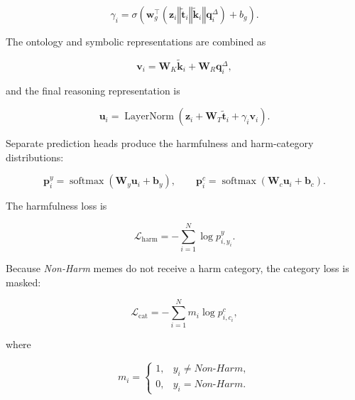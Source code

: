 \documentclass[11pt]{article}
\begin{document}
\begin{equation}
\gamma_i
=
\sigma
\left(
\mathbf{w}_{g}^{\top}
\left(
\mathbf{z}_i
\mathbin{\Vert}
\widetilde{\mathbf{t}}_i
\mathbin{\Vert}
\widetilde{\mathbf{k}}_i
\mathbin{\Vert}
\mathbf{q}^{\Delta}_i
\right)
+
b_g
\right).
\label{eq:confidence-gate}
\end{equation}

The ontology and symbolic representations are combined as

\begin{equation}
\mathbf{v}_i
=
\mathbf{W}_{K}\widetilde{\mathbf{k}}_i
+
\mathbf{W}_{R}\mathbf{q}^{\Delta}_i,
\label{eq:fused-symbolic}
\end{equation}

and the final reasoning representation is

\begin{equation}
\mathbf{u}_i
=
\operatorname{LayerNorm}
\left(
\mathbf{z}_i
+
\mathbf{W}_{T}\widetilde{\mathbf{t}}_i
+
\gamma_i\mathbf{v}_i
\right).
\label{eq:final-reasoning-representation}
\end{equation}

Separate prediction heads produce the harmfulness and harm-category
distributions:

\begin{equation}
\mathbf{p}^{y}_i
=
\operatorname{softmax}
\left(
\mathbf{W}_{y}\mathbf{u}_i+\mathbf{b}_{y}
\right),
\qquad
\mathbf{p}^{c}_i
=
\operatorname{softmax}
\left(
\mathbf{W}_{c}\mathbf{u}_i+\mathbf{b}_{c}
\right).
\label{eq:prediction-heads}
\end{equation}

The harmfulness loss is

\begin{equation}
\mathcal{L}_{\mathrm{harm}}
=
-
\sum_{i=1}^{N}
\log p^{y}_{i,y_i}.
\label{eq:harmfulness-loss}
\end{equation}

Because \textit{Non-Harm} memes do not receive a harm category, the
category loss is masked:

\begin{equation}
\mathcal{L}_{\mathrm{cat}}
=
-
\sum_{i=1}^{N}
m_i\log p^{c}_{i,c_i},
\label{eq:category-loss}
\end{equation}

where

\begin{equation}
m_i
=
\begin{cases}
1, & y_i \neq \textit{Non-Harm},\\
0, & y_i = \textit{Non-Harm}.
\end{cases}
\label{eq:category-mask}
\end{equation}
\end{document}
